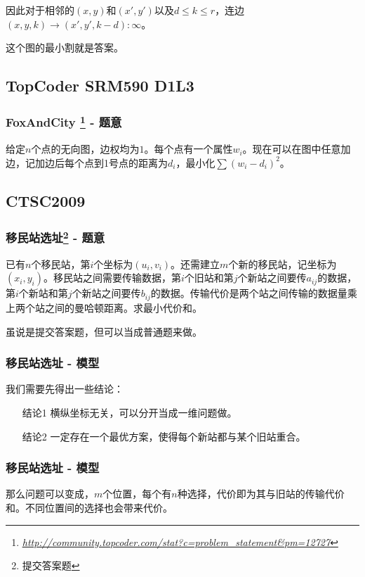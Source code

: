 \documentclass[11pt,dvipsnames,table]{beamer}
\newcommand{\hlink}[1]{
	\footnote{\fontsize{6pt}{\baselineskip}\href{#1}{\textsl{\underline{#1}}}}
}
\begin{document}
{\begin{frame}
	因此对于相邻的$(x,y)$和$(x',y')$以及$d\leq k\leq r$，连边$(x,y,k)\rightarrow(x',y',k-d):\infty$。
	
	这个图的最小割就是答案。
\end{frame}

\subsection{TopCoder SRM590 D1L3}
\begin{frame}
	\frametitle{FoxAndCity\hlink{http://community.topcoder.com/stat?c=problem\_statement\&pm=12727} - 题意}
	给定$n$个点的无向图，边权均为$1$。每个点有一个属性$w_i$。现在可以在图中任意加边，记加边后每个点到1号点的距离为$d_i$，最小化$\sum(w_i-d_i)^2$。
\end{frame}

\subsection{CTSC2009}
\begin{frame}
	\frametitle{移民站选址\footnote{\fontsize{6pt}{\baselineskip}提交答案题} - 题意}
	已有$n$个移民站，第$i$个坐标为$(u_i,v_i)$。还需建立$m$个新的移民站，记坐标为$(x_i,y_i)$。移民站之间需要传输数据，第$i$个旧站和第$j$个新站之间要传$a_{ij}$的数据，第$i$个新站和第$j$个新站之间要传$b_{ij}$的数据。传输代价是两个站之间传输的数据量乘上两个站之间的曼哈顿距离。求最小代价和。
	
	虽说是提交答案题，但可以当成普通题来做。
\end{frame}
\begin{frame}
	\frametitle{移民站选址 - 模型}
	我们需要先得出一些结论：
	\begin{itemize}
		\item[结论1] 横纵坐标无关，可以分开当成一维问题做。\pause
		\item[结论2] 一定存在一个最优方案，使得每个新站都与某个旧站重合。
	\end{itemize}
\end{frame}
\begin{frame}
	\frametitle{移民站选址 - 模型}
	那么问题可以变成，$m$个位置，每个有$n$种选择，代价即为其与旧站的传输代价和。不同位置间的选择也会带来代价。\pause
	

\end{frame}}
\end{document}

